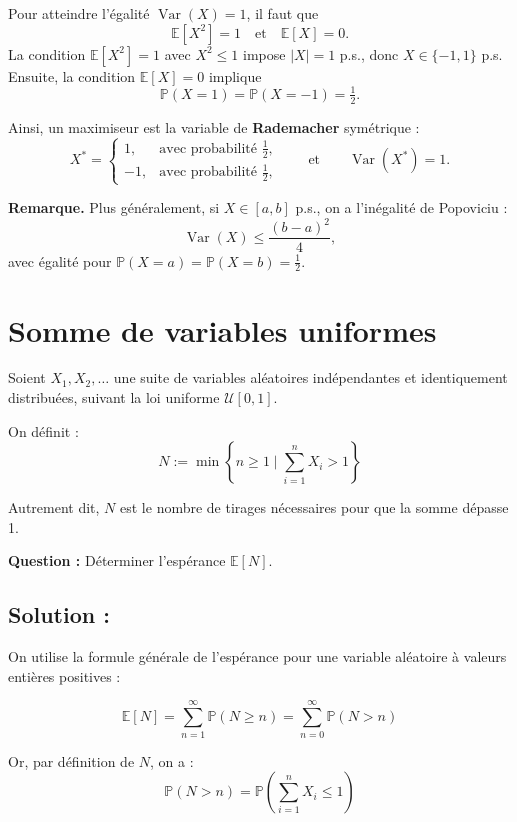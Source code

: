 Pour atteindre l'égalité $\operatorname{Var}(X) = 1$, il faut que
\[
\mathbb{E}[X^2] = 1 
\quad \text{et} \quad 
\mathbb{E}[X] = 0.
\]
La condition $\mathbb{E}[X^2]=1$ avec $X^2 \leq 1$ impose $|X|=1$ p.s., donc $X \in \{-1,1\}$ p.s.  
Ensuite, la condition $\mathbb{E}[X]=0$ implique
\[
\mathbb{P}(X=1)=\mathbb{P}(X=-1)=\tfrac{1}{2}.
\]

Ainsi, un maximiseur est la variable de \textbf{Rademacher} symétrique :
\[
X^* =
\begin{cases}
1, & \text{avec probabilité } \tfrac12, \\[6pt]
-1, & \text{avec probabilité } \tfrac12,
\end{cases}
\qquad \text{et} \qquad \operatorname{Var}(X^*)=1.
\]

\medskip
\textbf{Remarque.} Plus généralement, si $X \in [a,b]$ p.s., on a l'inégalité de Popoviciu :
\[
\operatorname{Var}(X) \leq \frac{(b-a)^2}{4},
\]
avec égalité pour $\mathbb{P}(X=a)=\mathbb{P}(X=b)=\tfrac12$.



\section{Somme de variables uniformes}
\begin{exerciseBox}
Soient \( X_1, X_2, \dots \) une suite de variables aléatoires indépendantes et identiquement distribuées, suivant la loi uniforme \( \mathcal{U}[0,1] \).

On définit :
\[
N := \min \left\{ n \geq 1 \mid \sum_{i=1}^n X_i > 1 \right\}
\]

Autrement dit, \( N \) est le nombre de tirages nécessaires pour que la somme dépasse 1.

\vspace{0.5em}
\textbf{Question :} Déterminer l'espérance \( \mathbb{E}[N] \).
\end{exerciseBox}

\subsection*{Solution :}


On utilise la formule générale de l'espérance pour une variable aléatoire à valeurs entières positives :

\[
\mathbb{E}[N] = \sum_{n=1}^\infty \mathbb{P}(N \geq n) = \sum_{n=0}^\infty \mathbb{P}(N > n)
\]

Or, par définition de \( N \), on a :
\[
\mathbb{P}(N > n) = \mathbb{P} \left( \sum_{i=1}^n X_i \leq 1 \right)
\]

